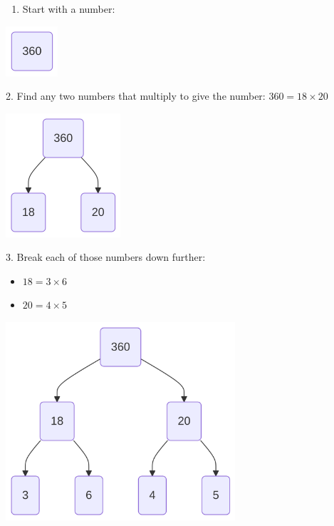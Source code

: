 \documentclass[
  letterpaper,
  DIV=11,
  numbers=noendperiod]{scrreprt}
\providecommand{\tightlist}{%
  \setlength{\itemsep}{0pt}\setlength{\parskip}{0pt}}
\begin{document}
\begin{enumerate}
\def\labelenumi{\arabic{enumi}.}
\tightlist
\item
  Start with a number:
\end{enumerate}

\label{mermaid-diagram}
\includegraphics[width=0.76in,height=0.73in]{chapters/Unit_1/1.2_Factors_Multiples_&_Prime_Factorization_files/figure-latex/mermaid-figure-1.png}

2. Find any two numbers that multiply to give the number:
\(360 = 18 × 20\)

\label{mermaid-diagram}
\includegraphics[width=1.68in,height=1.81in]{chapters/Unit_1/1.2_Factors_Multiples_&_Prime_Factorization_files/figure-latex/mermaid-figure-9.png}

3. Break each of those numbers down further:

\begin{itemize}
\tightlist
\item
  \(18 = 3 × 6\)
\item
  \(20 = 4 × 5\)
\end{itemize}

\label{mermaid-diagram}
\includegraphics[width=3.35in,height=2.9in]{chapters/Unit_1/1.2_Factors_Multiples_&_Prime_Factorization_files/figure-latex/mermaid-figure-8.png}
\end{document}
